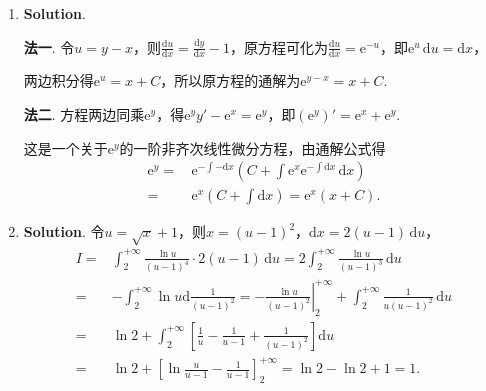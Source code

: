\documentclass[../main.tex]{subfiles}
\begin{document}
\begin{enumerate}
    \item \textbf{Solution}.

          \textbf{法一}. 令$u=y-x$，则$\frac{\mathrm{d}u}{\mathrm{d}x}=\frac{\mathrm{d}y}{\mathrm{d}x}
              -1$，原方程可化为$\frac{\mathrm{d}u}{\mathrm{d}x}=\mathrm{e}^{-u}$，即$\mathrm{e}
              ^{u}\,\mathrm{d}u=\mathrm{d}x$，

          两边积分得$\mathrm{e}^{u}=x+C$，所以原方程的通解为$\mathrm{e}^{y-x}=x+C$.

          \textbf{法二}. 方程两边同乘$\mathrm{e}^{y}$，得$\mathrm{e}^{y} y' - \mathrm{e}
              ^{x} = \mathrm{e}^{y}$，即$\left(\mathrm{e}^{y}\right)' = \mathrm{e}^{x} + \mathrm{e}
              ^{y}$.

          这是一个关于$\mathrm{e}^{y}$的一阶非齐次线性微分方程，由通解公式得
          \[
              \begin{aligned}
                  \mathrm{e}^{y} = {} & \,\mathrm{e}^{-\int -\mathrm{d}x}\left(C+\int \mathrm{e}^{x}\mathrm{e}^{-\int \mathrm{d}x}\,\mathrm{d}x\right) \\
                  = {}                & \,\mathrm{e}^{x}\left(C+\int \mathrm{d}x\right) = \mathrm{e}^{x}(x+C).
              \end{aligned}
          \]

    \item \textbf{Solution}. 令$u=\sqrt{x}+1$，则$x=(u-1)^{2}$，$\mathrm{d}x
              =2(u-1)\,\mathrm{d}u$，
          \[
              \begin{aligned}
                  I = {} & \int_{2}^{+\infty}\frac{\ln u}{(u-1)^4}\cdot 2(u-1)\,\mathrm{d}u = 2\int_{2}^{+\infty}\frac{\ln u}{(u-1)^3}\,\mathrm{d}u                                   \\
                  = {}   & -\int_{2}^{+\infty}\ln u \mathrm{d}\frac{1}{(u-1)^2}= -\left.\frac{\ln u}{(u-1)^2}\right|_{2}^{+\infty}+ \int_{2}^{+\infty}\frac{1}{u(u-1)^2}\,\mathrm{d}u \\
                  = {}   & \ln 2 + \int_{2}^{+\infty}\left[\frac{1}{u}-\frac{1}{u-1}+\frac{1}{(u-1)^2}\right]\mathrm{d}u                                                              \\
                  = {}   & \ln 2 + \left[\ln \frac{u}{u-1}- \frac{1}{u-1}\right]_{2}^{+\infty}= \ln 2 - \ln 2 + 1 = 1.
              \end{aligned}
          \]

\end{enumerate}
\end{document}
